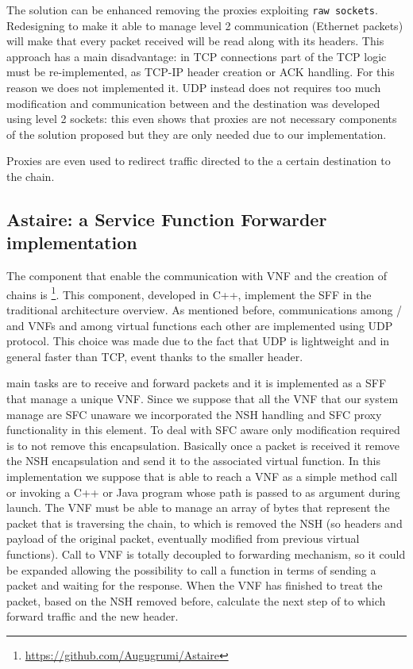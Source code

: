 The solution can be enhanced removing the proxies exploiting
\texttt{raw sockets}. Redesigning \ironhide{} to make it able to manage level 2
communication (Ethernet packets) will make that every packet received will
be read along with its headers. This approach has a main disadvantage: in TCP
connections part of the TCP logic must be re-implemented, as TCP-IP header
creation or ACK handling. For this reason we does not implemented it. UDP
instead does not requires too much modification and communication between 
\egress{} and the destination was developed using level 2 sockets: this even
shows that proxies are not necessary components of the solution proposed but
they are only needed due to our implementation.

Proxies are even used to redirect traffic directed to the a certain destination
to the chain.

\subsection{Astaire: a Service Function Forwarder implementation}
The component that enable the communication with VNF and the creation of chains
is \astaire{}\footnote{\url{https://github.com/Augugrumi/Astaire}}. This
component, developed in C++, implement the SFF in the traditional architecture
overview. As mentioned before, communications among \ingresses{}/\egresses{}
and VNFs and among virtual functions each other are implemented using UDP
protocol. This choice was made due to the fact that UDP is lightweight and in
general faster than TCP, event thanks to the smaller header. 

\astaire{} main tasks are to receive and forward packets and it is implemented
as a SFF that manage a unique VNF. Since we suppose that all the VNF that our
system manage are SFC unaware we incorporated the NSH handling and SFC proxy
functionality in this element. To deal with SFC aware only modification required
is to not remove this encapsulation. Basically once a packet is received it
remove the NSH encapsulation and send it to the associated virtual function. In
this implementation we suppose that \astaire{} is able to reach a VNF as a
simple method call or invoking a C++ or Java program whose path is passed to 
\astaire{} as argument during launch. The VNF must be able to manage an array of
bytes that represent the packet that is traversing the chain, to which is
removed the NSH (so headers and payload of the original packet, eventually
modified from previous virtual functions). Call to VNF is totally decoupled
to forwarding mechanism, so it could be expanded allowing the possibility to
call a function in terms of sending a packet and waiting for the response. When
the VNF has finished to treat the packet, based on the NSH removed before,
calculate the next step of to which forward traffic and the new header. 

